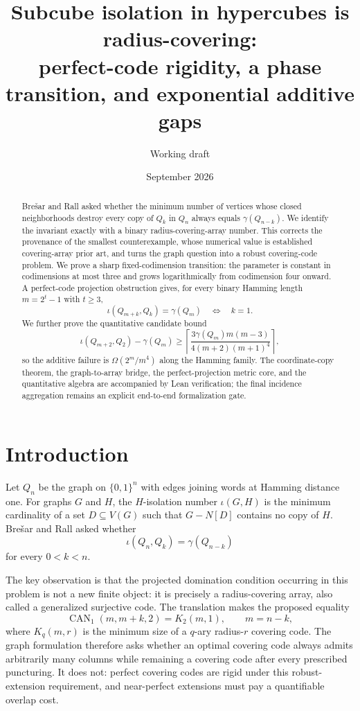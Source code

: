 \documentclass[11pt]{article}
\title{Subcube isolation in hypercubes is radius-covering:\\
perfect-code rigidity, a phase transition, and exponential additive gaps}
\author{Working draft}
\date{September 2026}
\theoremstyle{definition}
\theoremstyle{remark}
\newcommand{\CAN}{\operatorname{CAN}}
\newcommand{\Kcov}{K}
\begin{document}
\maketitle

\begin{abstract}
Bre\v{s}ar and Rall asked whether the minimum number of vertices whose closed
neighborhoods destroy every copy of $Q_k$ in $Q_n$ always equals
$\gamma(Q_{n-k})$.  We identify the invariant exactly with a binary
radius-covering-array number.  This corrects the provenance of the smallest
counterexample, whose numerical value is established covering-array prior art,
and turns the graph question into a robust covering-code problem.  We prove a
sharp fixed-codimension transition: the parameter is constant in codimensions
at most three and grows logarithmically from codimension four onward.  A
perfect-code projection obstruction gives, for every binary Hamming length
$m=2^t-1$ with $t\ge3$,
\[
  \iota(Q_{m+k},Q_k)=\gamma(Q_m)\quad\Longleftrightarrow\quad k=1.
\]
We further prove the quantitative candidate bound
\[
 \iota(Q_{m+2},Q_2)-\gamma(Q_m)
 \ge
 \left\lceil
 \frac{3\gamma(Q_m)m(m-3)}{4(m+2)(m+1)^4}
 \right\rceil,
\]
so the additive failure is $\Omega(2^m/m^4)$ along the Hamming family.  The
coordinate-copy theorem, the graph-to-array bridge, the perfect-projection
metric core, and the quantitative algebra are accompanied by Lean
verification; the final incidence aggregation remains an explicit
end-to-end formalization gate.
\end{abstract}

\section{Introduction}

Let $Q_n$ be the graph on $\{0,1\}^n$ with edges joining words at Hamming
distance one.  For graphs $G$ and $H$, the $H$-isolation number $\iota(G,H)$
is the minimum cardinality of a set $D\subseteq V(G)$ such that
$G-N[D]$ contains no copy of $H$.  Bre\v{s}ar and Rall asked whether
\begin{equation}\label{eq:BR}
  \iota(Q_n,Q_k)=\gamma(Q_{n-k})
\end{equation}
for every $0<k<n$.

The key observation is that the projected domination condition occurring in
this problem is not a new finite object: it is precisely a radius-covering
array, also called a generalized surjective code.  The translation makes the
proposed equality
\[
  \CAN_1(m,m+k,2)=\Kcov_2(m,1), \qquad m=n-k,
\]
where $\Kcov_q(m,r)$ is the minimum size of a $q$-ary radius-$r$ covering code.
The graph formulation therefore asks whether an optimal covering code always
admits arbitrarily many columns while remaining a covering code after every
prescribed puncturing.  It does not: perfect covering codes are rigid under
this robust-extension requirement, and near-perfect extensions must pay a
quantifiable overlap cost.
\end{document}
